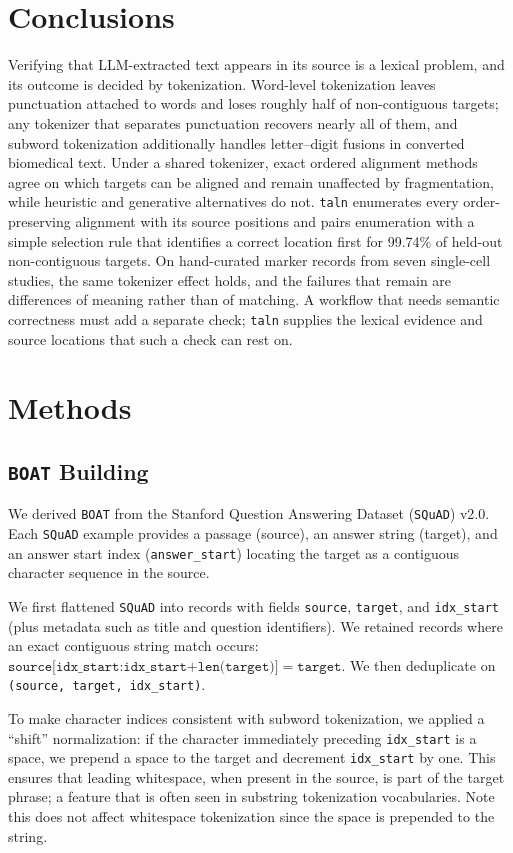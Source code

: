 \documentclass[pdflatex,lineno,referee,sn-vancouver-num]{sn-jnl}
\theoremstyle{thmstyleone}
\theoremstyle{thmstylethree}
\theoremstyle{thmstyletwo}
\begin{document}
\section{Conclusions}
Verifying that LLM-extracted text appears in its source is a lexical problem, and its outcome is decided by tokenization. Word-level tokenization leaves punctuation attached to words and loses roughly half of non-contiguous targets; any tokenizer that separates punctuation recovers nearly all of them, and subword tokenization additionally handles letter--digit fusions in converted biomedical text. Under a shared tokenizer, exact ordered alignment methods agree on which targets can be aligned and remain unaffected by fragmentation, while heuristic and generative alternatives do not. \texttt{taln} enumerates every order-preserving alignment with its source positions and pairs enumeration with a simple selection rule that identifies a correct location first for 99.74\% of held-out non-contiguous targets. On hand-curated marker records from seven single-cell studies, the same tokenizer effect holds, and the failures that remain are differences of meaning rather than of matching. A workflow that needs semantic correctness must add a separate check; \texttt{taln} supplies the lexical evidence and source locations that such a check can rest on.

\section{Methods}
\subsection{\texttt{BOAT} Building}
We derived \texttt{BOAT} from the Stanford Question Answering Dataset (\texttt{SQuAD}) v2.0. Each \texttt{SQuAD} example provides a passage (source), an answer string (target), and an answer start index (\texttt{answer\_start}) locating the target as a contiguous character sequence in the source.

We first flattened \texttt{SQuAD} into records with fields \texttt{source}, \texttt{target}, and \texttt{idx\_start} (plus metadata such as title and question identifiers). We retained records where an exact contiguous string match occurs:  $\texttt{source[idx\_start:idx\_start+len(target)]} = \texttt{target}.$ We then deduplicate on \texttt{(source, target, idx\_start)}.

To make character indices consistent with subword tokenization, we applied a ``shift'' normalization: if the character immediately preceding \texttt{idx\_start} is a space, we prepend a space to the target and decrement \texttt{idx\_start} by one. This ensures that leading whitespace, when present in the source, is part of the target phrase; a feature that is often seen in substring tokenization vocabularies. Note this does not affect whitespace tokenization since the space is prepended to the string.
\end{document}
